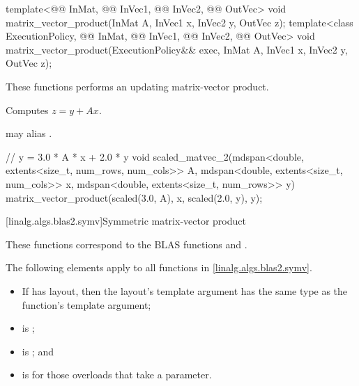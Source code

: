 \begin{itemdecl}
  template<@@ InMat, @@ InVec1, @@ InVec2, @@ OutVec>
    void matrix_vector_product(InMat A, InVec1 x, InVec2 y, OutVec z);
  template<class ExecutionPolicy,
           @@ InMat, @@ InVec1, @@ InVec2, @@ OutVec>
    void matrix_vector_product(ExecutionPolicy&& exec,
                               InMat A, InVec1 x, InVec2 y, OutVec z);
\end{itemdecl}

\begin{itemdescr}
\pnum
These functions performs an updating matrix-vector product.

\pnum
\effects
Computes $z = y + A x$.

\pnum
\remarks
{} may alias .
\end{itemdescr}

\begin{example}
\begin{codeblock}
// y = 3.0 * A * x + 2.0 * y
void scaled_matvec_2(mdspan<double, extents<size_t, num_rows, num_cols>> A,
  mdspan<double, extents<size_t, num_cols>> x, mdspan<double, extents<size_t, num_rows>> y) {
  matrix_vector_product(scaled(3.0, A), x, scaled(2.0, y), y);
}
\end{codeblock}
\end{example}

[linalg.algs.blas2.symv]{Symmetric matrix-vector product}

\pnum
\begin{note}
These functions correspond to the BLAS functions
 and \supercite{blas2}.
\end{note}

\pnum
The following elements apply to all functions in \ref{linalg.algs.blas2.symv}.

\pnum
\mandates
\begin{itemize}
\item
If  has  layout,
then the layout's  template argument has
the same type as the function's  template argument;
\item
{} is ;
\item
{}
is ; and
\item
{}
is  for those overloads that take a  parameter.
\end{itemize}

